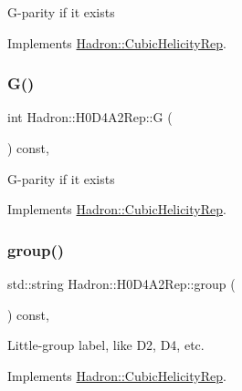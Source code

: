 G-\/parity if it exists 

Implements \mbox{\hyperlink{structHadron_1_1CubicHelicityRep_a50689f42be1e6170aa8cf6ad0597018b}{Hadron\+::\+Cubic\+Helicity\+Rep}}.

\mbox{\label{structHadron_1_1H0D4A2Rep_a637522dc6caee2869b2bb632a4c5a5b5}} 
\subsubsection{\texorpdfstring{G()}{G()}\hspace{0.1cm}{\footnotesize\ttfamily [2/2]}}
{\footnotesize\ttfamily int Hadron\+::\+H0\+D4\+A2\+Rep\+::G (\begin{DoxyParamCaption}{ }\end{DoxyParamCaption}) const\hspace{0.3cm}{\ttfamily [inline]}, {\ttfamily [virtual]}}

G-\/parity if it exists 

Implements \mbox{\hyperlink{structHadron_1_1CubicHelicityRep_a50689f42be1e6170aa8cf6ad0597018b}{Hadron\+::\+Cubic\+Helicity\+Rep}}.

\mbox{\label{structHadron_1_1H0D4A2Rep_a9bffbf0884c199fda3b8b85c4f43e333}} 
\subsubsection{\texorpdfstring{group()}{group()}\hspace{0.1cm}{\footnotesize\ttfamily [1/3]}}
{\footnotesize\ttfamily std\+::string Hadron\+::\+H0\+D4\+A2\+Rep\+::group (\begin{DoxyParamCaption}{ }\end{DoxyParamCaption}) const\hspace{0.3cm}{\ttfamily [inline]}, {\ttfamily [virtual]}}

Little-\/group label, like D2, D4, etc. 

Implements \mbox{\hyperlink{structHadron_1_1CubicHelicityRep_a101a7d76cd8ccdad0f272db44b766113}{Hadron\+::\+Cubic\+Helicity\+Rep}}.

\mbox{\label{structHadron_1_1H0D4A2Rep_a9bffbf0884c199fda3b8b85c4f43e333}} 
